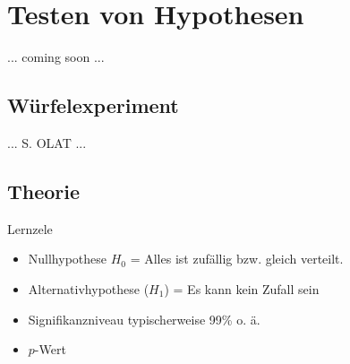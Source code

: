 
\section{Testen von Hypothesen}

... coming soon ...


\subsection{Würfelexperiment}

... S. OLAT ...


\subsection{Theorie}

Lernzele

\begin{itemize}
\item Nullhypothese $H_0$ = Alles ist zufällig bzw. gleich verteilt.

\item Alternativhypothese ($H_1$) = Es kann kein Zufall sein

\item Signifikanzniveau typischerweise 99\% o. ä.

\item $p$-Wert
  
\end{itemize}


\newpage
